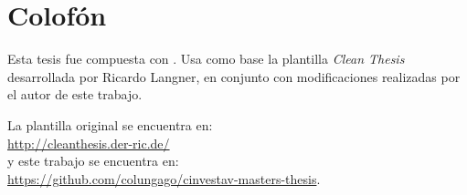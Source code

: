 %
\pagestyle{empty}
\hfill
\vfill
{}
\section*{Colofón}

Esta tesis fue compuesta con \LaTeXe.
Usa como base la plantilla \textit{Clean Thesis} desarrollada por Ricardo Langner, en conjunto con modificaciones realizadas por el autor de este trabajo.

La plantilla original se encuentra en: \\
\url{http://cleanthesis.der-ric.de/} \\
y este trabajo se encuentra en:\\ 
\url{https://github.com/colungago/cinvestav-masters-thesis}.
